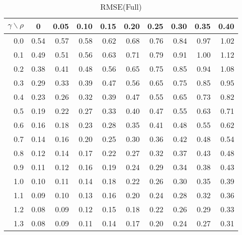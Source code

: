 \documentclass[12pt]{article}
\begin{document}
\begin{table}[!tbp]
\caption{RMSE(Full)}
 \begin{center}
 \begin{tabular}{r|rrrrrrrrr}\hline\hline
\multicolumn{1}{c|}{$\gamma\backslash\rho$}&\multicolumn{1}{c}{0}&\multicolumn{1}{c}{0.05}&\multicolumn{1}{c}{0.10}&\multicolumn{1}{c}{0.15}&\multicolumn{1}{c}{0.20}&\multicolumn{1}{c}{0.25}&\multicolumn{1}{c}{0.30}&\multicolumn{1}{c}{0.35}&\multicolumn{1}{c}{0.40}\tabularnewline
\hline


0.0&0.54&0.57&0.58&0.62&0.68&0.76&0.84&0.97&1.02\tabularnewline
0.1&0.49&0.51&0.56&0.63&0.71&0.79&0.91&1.00&1.12\tabularnewline
0.2&0.38&0.41&0.48&0.56&0.65&0.75&0.85&0.94&1.08\tabularnewline
0.3&0.29&0.33&0.39&0.47&0.56&0.65&0.75&0.85&0.95\tabularnewline
0.4&0.23&0.26&0.32&0.39&0.47&0.55&0.65&0.73&0.82\tabularnewline
0.5&0.19&0.22&0.27&0.33&0.40&0.47&0.55&0.63&0.71\tabularnewline
0.6&0.16&0.18&0.23&0.28&0.35&0.41&0.48&0.55&0.62\tabularnewline
0.7&0.14&0.16&0.20&0.25&0.30&0.36&0.42&0.48&0.54\tabularnewline
0.8&0.12&0.14&0.17&0.22&0.27&0.32&0.37&0.43&0.48\tabularnewline
0.9&0.11&0.12&0.16&0.19&0.24&0.29&0.34&0.38&0.43\tabularnewline
1.0&0.10&0.11&0.14&0.18&0.22&0.26&0.30&0.35&0.39\tabularnewline
1.1&0.09&0.10&0.13&0.16&0.20&0.24&0.28&0.32&0.36\tabularnewline
1.2&0.08&0.09&0.12&0.15&0.18&0.22&0.26&0.29&0.33\tabularnewline
1.3&0.08&0.09&0.11&0.14&0.17&0.20&0.24&0.27&0.31\tabularnewline
\hline
\end{tabular}

\end{center}

\end{table}

%
\end{document}

